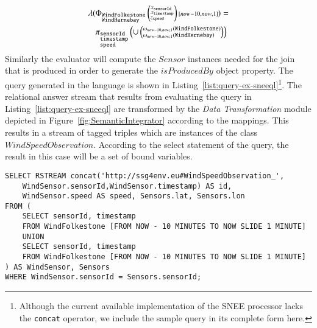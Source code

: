 \begin{align*}
\lambda ( &\Phi_{ 
			\begin{subarray}{l}
			\mathtt{WindFolkestone}\\
			\mathtt{WindHernebay}
			\end{subarray}}
\left(
\begin{subarray}{l}
x_{\mathtt{sensorId}}\\x_{\mathtt{timestamp}}\\z_{\mathtt{speed}}
\end{subarray}
\right) {\scriptstyle [now-10,now,1]} ) =  \\ 
&\pi_{
\begin{subarray}{l}
\mathtt{sensorId}\\
\mathtt{timestamp}\\
\mathtt{speed}
\end{subarray}}
\left( \cup \left( 
	\begin{subarray}{l}
		\omega_{now-10,now,1}( \mathtt{WindFolkestone}) \\
		\omega_{now-10,now,1}(\mathtt{WindHernebay})
	\end{subarray}
\right) \right)
\end{align*}
Similarly the evaluator will compute the $Sensor$ instances needed for the join that is produced in order to generate the $isProducedBy$ object property.
The query generated in the \sneeql language is shown in Listing~\ref{list:query-ex-sneeql}\footnote {Although the current available implementation of the SNEE processor lacks the \texttt{concat} operator, we include the sample query in its complete form here.}. The relational answer stream that results from evaluating the query in Listing~\ref{list:query-ex-sneeql} are transformed by the \textit{Data Transformation} module depicted in Figure~\ref{fig:SemanticIntegrator} according to the \stwoo mappings.
This results in a stream of tagged triples which are instances of the class $WindSpeedObservation$. According to the select statement of the \sparqlstr query, the result in this case will be a set of bound variables.

\begin{lstlisting}[style=SNEEqlStyle,language=SNEEql,frame=none,float,label=list:query-ex-sneeql,caption=The \sneeql query that is generated for the input query in Listing~\ref{list:query-example}.]
SELECT RSTREAM concat('http://ssg4env.eu#WindSpeedObservation_',
	WindSensor.sensorId,WindSensor.timestamp) AS id, 
	WindSensor.speed AS speed, Sensors.lat, Sensors.lon
FROM (
	SELECT sensorId, timestamp 
	FROM WindFolkestone [FROM NOW - 10 MINUTES TO NOW SLIDE 1 MINUTE] 
	UNION 
	SELECT sensorId, timestamp 
	FROM WindFolkestone [FROM NOW - 10 MINUTES TO NOW SLIDE 1 MINUTE] 
) AS WindSensor, Sensors 
WHERE WindSensor.sensorId = Sensors.sensorId; 
\end{lstlisting}






